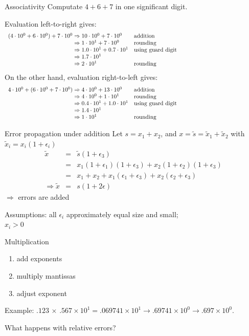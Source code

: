 \begin{numberedframe}{Associativity}
  Computate $4+6+7$ in one significant digit.
  
Evaluation left-to-right gives:
\[ 
\begin{array}{l@{{}\Rightarrow{}}lp{3in}}
(4\cdot10^0 + 6\cdot10^0)+7\cdot10^0&10\cdot10^0+7\cdot10^0&addition\\
&1\cdot 10^1 + 7\cdot10^0&rounding\\
&1.0\cdot 10^1 + 0.7\cdot10^1&using guard digit\\
&1.7\cdot 10^1\\
&2\cdot10^1&rounding
\end{array}
\]
On the other hand, evaluation right-to-left gives:
\[ 
\begin{array}{l@{{}\Rightarrow{}}lp{3in}}
4\cdot10^0 + (6\cdot10^0 + 7\cdot10^0)&4\cdot 10^0 + 13\cdot10^0&addition\\
&4\cdot 10^0 + 1\cdot10^1&rounding\\
&0.4\cdot 10^1 + 1.0\cdot10^1&using guard digit\\
&1.4\cdot 10^1\\
&1\cdot10^1&rounding
\end{array}
\]
\end{numberedframe}

\begin{numberedframe}{Error propagation under addition}
Let $s=x_1+x_2$, and $x=\tilde s=\tilde x_1+\tilde x_2$
with $\tilde x_i=x_i(1+\epsilon_i)$
\begin{eqnarray*}
\tilde x&=&\tilde s(1+\epsilon_3)\\
&=&x_1(1+\epsilon_1)(1+\epsilon_3)+x_2(1+\epsilon_2)(1+\epsilon_3)\\
&=&x_1+x_2+x_1(\epsilon_1+\epsilon_3)+x_2(\epsilon_2+\epsilon_3)\\
\Rightarrow\tilde x&=&s(1+2\epsilon)
\end{eqnarray*}
$\Rightarrow$ errors are added

Assumptions: all $\epsilon_i$ approximately equal size and small;\\
$x_i>0$
\end{numberedframe}

\begin{numberedframe}{Multiplication}
  \begin{enumerate}
  \item add exponents
  \item multiply mantissas
  \item adjust exponent
  \end{enumerate}

Example: $.123\,\times\,.567\times10^1=.069741\times10^1\rightarrow
.69741\times10^0\rightarrow.697\times10^0$.

What happens with relative errors?
\end{numberedframe}

